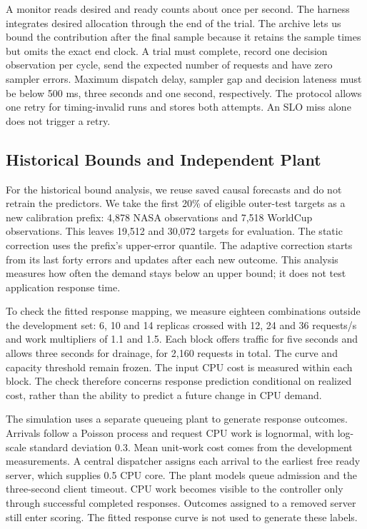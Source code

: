 \documentclass[10pt,twocolumn,a4paper]{article}
\begin{document}
A monitor reads desired and ready counts about once per second. The harness integrates desired allocation through the end of the trial. The archive lets us bound the contribution after the final sample because it retains the sample times but omits the exact end clock. A trial must complete, record one decision observation per cycle, send the expected number of requests and have zero sampler errors. Maximum dispatch delay, sampler gap and decision lateness must be below 500 ms, three seconds and one second, respectively. The protocol allows one retry for timing-invalid runs and stores both attempts. An SLO miss alone does not trigger a retry.

\subsection{Historical Bounds and Independent Plant}
For the historical bound analysis, we reuse saved causal forecasts and do not retrain the predictors. We take the first 20\% of eligible outer-test targets as a new calibration prefix: 4,878 NASA observations and 7,518 WorldCup observations. This leaves 19,512 and 30,072 targets for evaluation. The static correction uses the prefix's upper-error quantile. The adaptive correction starts from its last forty errors and updates after each new outcome. This analysis measures how often the demand stays below an upper bound; it does not test application response time.

To check the fitted response mapping, we measure eighteen combinations outside the development set: 6, 10 and 14 replicas crossed with 12, 24 and 36 requests/s and work multipliers of 1.1 and 1.5. Each block offers traffic for five seconds and allows three seconds for drainage, for 2,160 requests in total. The curve and capacity threshold remain frozen. The input CPU cost is measured within each block. The check therefore concerns response prediction conditional on realized cost, rather than the ability to predict a future change in CPU demand.

The simulation uses a separate queueing plant to generate response outcomes. Arrivals follow a Poisson process and request CPU work is lognormal, with log-scale standard deviation 0.3. Mean unit-work cost comes from the development measurements. A central dispatcher assigns each arrival to the earliest free ready server, which supplies 0.5 CPU core. The plant models queue admission and the three-second client timeout. CPU work becomes visible to the controller only through successful completed responses. Outcomes assigned to a removed server still enter scoring. The fitted response curve is not used to generate these labels.
\end{document}
